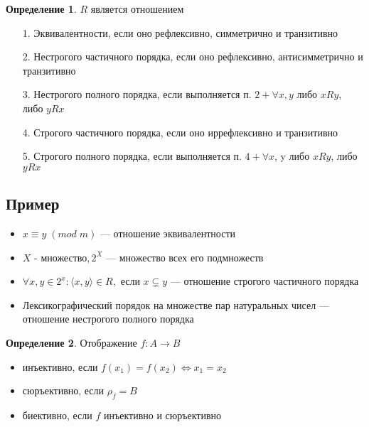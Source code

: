 \documentclass[12pt,letterpaper]{report}
\theoremstyle{definition}
\newtheorem*{conj}{Определение}
\begin{document}
\begin{conj}
    $R$ является отношением
\end{conj}
\begin{itemize}
    \item[1.] Эквивалентности, если оно рефлексивно, симметрично и транзитивно
    \item[2.] Нестрогого частичного порядка, если оно рефлексивно, антисимметрично и транзитивно
    \item[3.] Нестрогого полного порядка, если выполняется п. $2 + \forall x, y$ либо $xRy$, либо $yRx$
    \item[4.] Строгого частичного порядка, если оно иррефлексивно и транзитивно
    \item[5.] Строгого полного порядка, если выполняется п. $4 + \forall x$, y либо $xRy$, либо $yRx$
\end{itemize}

\subsection*{Пример}
\begin{itemize}
    \item $x \equiv y \; (mod \; m)$ — отношение эквивалентности
    \item $X$ - множество$, 2^X$ — множество всех его подмножеств
    \item $\forall x, y \in 2^x : \langle x, y \rangle \in R, $ если $ x \subsetneq y$ — отношение строгого частичного порядка
    \item Лексикографический порядок на множестве пар натуральных чисел — отношение нестрогого полного порядка
\end{itemize}

\begin{conj}
    Отображение $f: A  \longrightarrow B$ 
\end{conj}
\begin{itemize}
    \item инъективно, если $f(x_1) = f(x_2) \Longleftrightarrow x_1 = x_2$
    \item сюръективно, если $\rho_f = B$
    \item биективно, если $f$ инъективно и сюръективно
\end{itemize}
\end{document}
